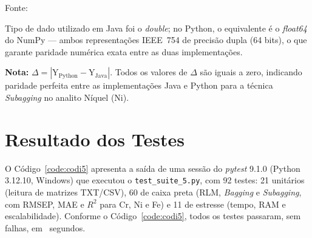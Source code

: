 \begin{table}[H]
\begin{threeparttable}
\begin{center}
\begin{minipage}{0.85\linewidth}
\begin{tablenotes}
\footnotesize
\item Fonte:~\oautor
\item[a] Tipo de dado utilizado em Java foi o \textit{double}; no Python,
o equivalente é o \textit{float64} do NumPy — ambos representações IEEE~754
de precisão dupla (64 bits), o que garante paridade numérica exata entre as
duas implementações.
\item \textbf{Nota:} $\Delta = |\text{Y}_{\text{Python}} - \text{Y}_{\text{Java}}|$.
Todos os valores de $\Delta$ são iguais a zero, indicando paridade
perfeita entre as implementações Java e Python para a técnica \textit{Subagging}
no analito Níquel (Ni).
\end{tablenotes}
\end{minipage}
\end{center}
\end{threeparttable}
\end{table}


\chapter{Resultado dos Testes}
\label{cha:resultadotestes}


O Código~\ref{code:codi5} apresenta a saída de uma sessão do \textit{pytest} 9.1.0 (Python 3.12.10, Windows) que executou o \texttt{test\_suite\_5.py}, com 92 testes: 21 unitários (leitura de matrizes TXT/CSV), 60 de caixa preta (RLM, \textit{Bagging} e \textit{Subagging}, com RMSEP, MAE e $R^2$ para Cr, Ni e Fe) e 11 de estresse (tempo, RAM e escalabilidade). Conforme o Código~\ref{code:codi5}, todos os testes passaram, sem falhas, em \testes~segundos.

